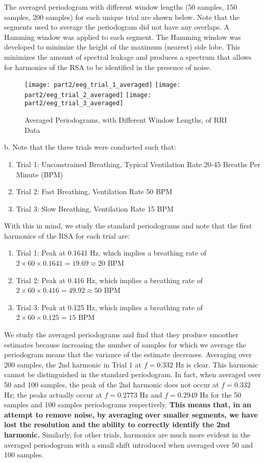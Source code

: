 \noindent{}The averaged periodogram with different window lengths (50 samples, 150 samples, 200 samples) for each unique trial are shown below. Note that the segments used to average the periodogram did not have any overlaps. A Hamming window was applied to each segment. The Hamming window was developed to minimize the height of the maximum (nearest) side lobe. This minimizes the amount of spectral leakage and produces a spectrum that allows for harmonics of the RSA to be identified in the presence of noise.

\begin{figure}[H]
\centering{}
\texttt{[image: part2/eeg\_trial\_1\_averaged]}
\texttt{[image: part2/eeg\_trial\_2\_averaged]}
\texttt{[image: part2/eeg\_trial\_3\_averaged]}
\caption{Averaged Periodograms, with Different Window Lengths, of RRI Data}
\end{figure}

\noindent{}b. Note that the three trials were conducted such that:
\begin{enumerate}
\item Trial 1: Unconstrained Breathing, Typical Ventilation Rate 20-45 Breaths Per Minute (BPM)
\item Trial 2: Fast Breathing, Ventilation Rate 50 BPM
\item Trial 3: Slow Breathing, Ventilation Rate 15 BPM\\
\end{enumerate}

\noindent{}With this in mind, we study the standard periodograms and note that the first harmonics of the RSA for each trial are:
\begin{enumerate}
\item Trial 1: Peak at 0.1641 Hz, which implies a breathing rate of $2 \times 60 \times 0.1641 = 19.69 \approx 20$ BPM
\item Trial 2: Peak at 0.416 Hz, which implies a breathing rate of $2 \times 60 \times 0.416 = 49.92 \approx 50$ BPM
\item Trial 3: Peak at 0.125 Hz, which implies a breathing rate of $2  \times 60 \times 0.125 = 15$ BPM\\
\end{enumerate}

\noindent{}We study the averaged periodograms and find that they produce smoother estimates because increasing the number of samples for which we average the periodogram means that the variance of the estimate decreases. Averaging over 200 samples, the 2nd harmonic in Trial 1 at $f=0.332$ Hz is clear. This harmonic cannot be distinguished in the standard periodogram. In fact, when averaged over 50 and 100 samples, the peak of the 2nd harmonic does not occur at $f=0.332$ Hz; the peaks actually occur at $f=0.2773$ Hz and $f=0.2949$ Hz for the 50 samples and 100 samples periodograms respectively. \textbf{This means that, in an attempt to remove noise, by averaging over smaller segments, we have lost the resolution and the ability to correctly identify the 2nd harmonic.} Similarly, for other trials, harmonics are much more evident in the averaged periodogram with a small shift introduced when averaged over 50 and 100 samples.\\

